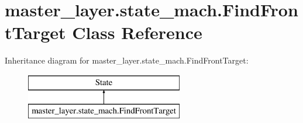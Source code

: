 \hypertarget{classmaster__layer_1_1state__mach_1_1FindFrontTarget}{}\section{master\+\_\+layer.\+state\+\_\+mach.\+Find\+Front\+Target Class Reference}
\label{classmaster__layer_1_1state__mach_1_1FindFrontTarget}
Inheritance diagram for master\+\_\+layer.\+state\+\_\+mach.\+Find\+Front\+Target\+:\begin{figure}[H]
\begin{center}
\leavevmode
\includegraphics[height=2.000000cm]{classmaster__layer_1_1state__mach_1_1FindFrontTarget}
\end{center}
\end{figure}
